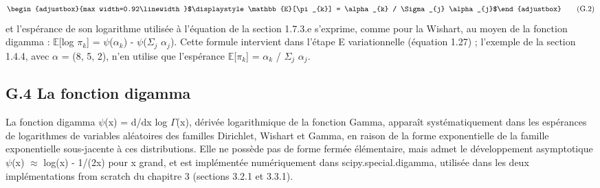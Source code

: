 \begin{equation}
\begin{adjustbox}{max width=0.92\linewidth}$\displaystyle \mathbb{E}[\pi _{k}] = \alpha _{k} / \Sigma _{j} \alpha _{j}$\end{adjustbox}
\tag{G.2}
\label{eq:G_2}
\end{equation}
et l'espérance de son logarithme  utilisée à l'équation de la section 1.7.3.e  s'exprime, comme pour la Wishart, au moyen de la fonction digamma : $\mathbb{E}$[log $\pi _{k}$] = $\psi $($\alpha _{k}$) - $\psi $($\Sigma _{j}$ $\alpha _{j}$). Cette formule intervient dans l'étape E variationnelle (équation 1.27) ; l'exemple de la section 1.4.4, avec $\alpha $ = (8, 5, 2), n'en utilise que l'espérance $\mathbb{E}$[$\pi _{k}$] = $\alpha _{k}$ / $\Sigma _{j}$ $\alpha _{j}$.

\subsection*{G.4 La fonction digamma}
La fonction digamma $\psi $(x) = d/dx log $\Gamma $(x), dérivée logarithmique de la fonction Gamma, apparaît systématiquement dans les espérances de logarithmes de variables aléatoires des familles Dirichlet, Wishart et Gamma, en raison de la forme exponentielle de la famille exponentielle sous-jacente à ces distributions. Elle ne possède pas de forme fermée élémentaire, mais admet le développement asymptotique $\psi $(x) $\approx $ log(x) - 1/(2x) pour x grand, et est implémentée numériquement dans scipy.special.digamma, utilisée dans les deux implémentations from scratch du chapitre 3 (sections 3.2.1 et 3.3.1).
